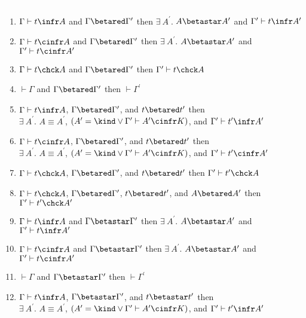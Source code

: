\begin{theorem}
    \textcolor{white}{\_}
    \begin{enumerate}
        \item $\Gamma \vdash t \infr A$ and $\Gamma \betared \Gamma^\prime$ then $\exists\ A^\prime.$ $A \betastar A^\prime$ and $\Gamma^\prime \vdash t \infr A^\prime$
        \item $\Gamma \vdash t \cinfr A$ and $\Gamma \betared \Gamma^\prime$ then $\exists\ A^\prime.$ $A \betastar A^\prime$ and $\Gamma^\prime \vdash t \cinfr A^\prime$
        \item $\Gamma \vdash t \chck A$ and $\Gamma \betared \Gamma^\prime$ then $\Gamma^\prime \vdash t \chck A$
        \item $\vdash \Gamma$ and $\Gamma \betared \Gamma^\prime$ then $\vdash \Gamma^\prime$
        \item $\Gamma \vdash t \infr A$, $\Gamma \betared \Gamma^\prime$, and $t \betared t^\prime$ then \\ $\exists\ A^\prime.$ $A \equiv A^\prime$, $(A^\prime = \kind \vee \Gamma^\prime \vdash A^\prime \cinfr K)$, and $\Gamma^\prime \vdash t^\prime \infr A^\prime$
        \item $\Gamma \vdash t \cinfr A$, $\Gamma \betared \Gamma^\prime$, and $t \betared t^\prime$ then \\ $\exists\ A^\prime.$ $A \equiv A^\prime$, $(A^\prime = \kind \vee \Gamma^\prime \vdash A^\prime \cinfr K)$, and $\Gamma^\prime \vdash t^\prime \cinfr A^\prime$
        \item $\Gamma \vdash t \chck A$, $\Gamma \betared \Gamma^\prime$, and $t \betared t^\prime$ then $\Gamma^\prime \vdash t^\prime \chck A$
        \item $\Gamma \vdash t \chck A$, $\Gamma \betared \Gamma^\prime$, $t \betared t^\prime$, and $A \betared A^\prime$ then $\Gamma^\prime \vdash t^\prime \chck A^\prime$
        \item $\Gamma \vdash t \infr A$ and $\Gamma \betastar \Gamma^\prime$ then $\exists\ A^\prime.$ $A \betastar A^\prime$ and $\Gamma^\prime \vdash t \infr A^\prime$
        \item $\Gamma \vdash t \cinfr A$ and $\Gamma \betastar \Gamma^\prime$ then $\exists\ A^\prime.$ $A \betastar A^\prime$ and $\Gamma^\prime \vdash t \cinfr A^\prime$
        \item $\vdash \Gamma$ and $\Gamma \betastar \Gamma^\prime$ then $\vdash \Gamma^\prime$
        \item $\Gamma \vdash t \infr A$, $\Gamma \betastar \Gamma^\prime$, and $t \betastar t^\prime$ then \\ $\exists\ A^\prime.$ $A \equiv A^\prime$, $(A^\prime = \kind \vee \Gamma^\prime \vdash A^\prime \cinfr K)$, and $\Gamma^\prime \vdash t^\prime \infr A^\prime$

\end{enumerate}
\end{theorem}
